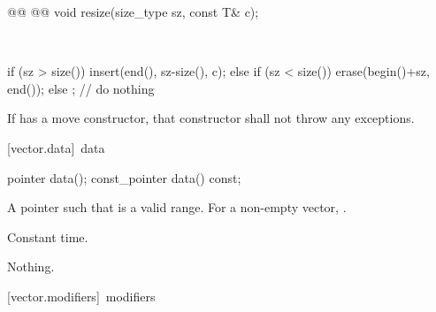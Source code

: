 \documentclass[american,twoside]{book}
\begin{document}
%
\begin{itemdecl}
@@ @@
  void resize(size_type sz, const T& c);
\end{itemdecl}

\begin{itemdescr}
\pnum
\effects\ 
\begin{codeblock}
if (sz > size())
  insert(end(), sz-size(), c);
else if (sz < size())
  erase(begin()+sz, end());
else
  ;                 // do nothing
\end{codeblock}

\pnum
\requires If  has a move constructor, that
constructor shall not throw any exceptions.
\end{itemdescr}

[vector.data]{\ data}
%
\begin{itemdecl}
pointer         data();
const_pointer   data() const;
\end{itemdecl}

\begin{itemdescr}
\pnum
\returns
A pointer such that  is a valid range. For a
non-empty vector, \tcode{data()} \tcode{==} \tcode{\&front()}.

\pnum
\complexity
Constant time.

\pnum
\throws
Nothing.
\end{itemdescr}

[vector.modifiers]{\ modifiers}
\end{document}
